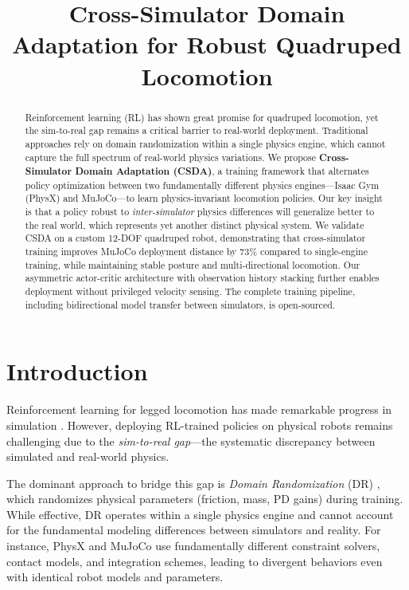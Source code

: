 \documentclass[conference]{IEEEtran}
\title{Cross-Simulator Domain Adaptation for Robust Quadruped Locomotion}
\author{
\IEEEauthorblockN{Anonymous}
\IEEEauthorblockA{Anonymous Institution}
}
\begin{document}
\maketitle

\begin{abstract}
Reinforcement learning (RL) has shown great promise for quadruped locomotion, yet the sim-to-real gap remains a critical barrier to real-world deployment. Traditional approaches rely on domain randomization within a single physics engine, which cannot capture the full spectrum of real-world physics variations. We propose \textbf{Cross-Simulator Domain Adaptation (CSDA)}, a training framework that alternates policy optimization between two fundamentally different physics engines---Isaac Gym (PhysX) and MuJoCo---to learn physics-invariant locomotion policies. Our key insight is that a policy robust to \textit{inter-simulator} physics differences will generalize better to the real world, which represents yet another distinct physical system. We validate CSDA on a custom 12-DOF quadruped robot, demonstrating that cross-simulator training improves MuJoCo deployment distance by 73\% compared to single-engine training, while maintaining stable posture and multi-directional locomotion. Our asymmetric actor-critic architecture with observation history stacking further enables deployment without privileged velocity sensing. The complete training pipeline, including bidirectional model transfer between simulators, is open-sourced.
\end{abstract}

\section{Introduction}

Reinforcement learning for legged locomotion has made remarkable progress in simulation \cite{rudin2022learning, margolis2023rapid}. However, deploying RL-trained policies on physical robots remains challenging due to the \textit{sim-to-real gap}---the systematic discrepancy between simulated and real-world physics.

The dominant approach to bridge this gap is \textit{Domain Randomization} (DR) \cite{tobin2017domain}, which randomizes physical parameters (friction, mass, PD gains) during training. While effective, DR operates within a single physics engine and cannot account for the fundamental modeling differences between simulators and reality. For instance, PhysX and MuJoCo use fundamentally different constraint solvers, contact models, and integration schemes, leading to divergent behaviors even with identical robot models and parameters.
\end{document}
